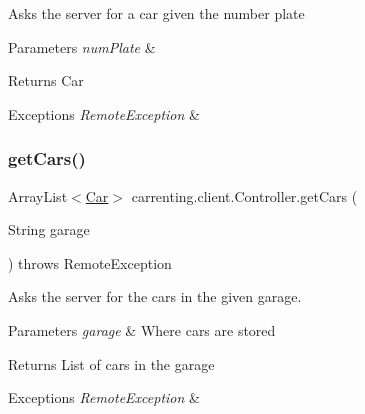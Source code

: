 Asks the server for a car given the number plate


\begin{DoxyParams}{Parameters}
{\em num\+Plate} & \\
\hline
\end{DoxyParams}
\begin{DoxyReturn}{Returns}
Car 
\end{DoxyReturn}

\begin{DoxyExceptions}{Exceptions}
{\em Remote\+Exception} & \\
\hline
\end{DoxyExceptions}
\mbox{\label{classcarrenting_1_1client_1_1_controller_a1e9a90a7164b6a988e23d77ecf39eea9}} 
\subsubsection{\texorpdfstring{getCars()}{getCars()}}
{\footnotesize\ttfamily Array\+List$<$\mbox{\hyperlink{classcarrenting_1_1server_1_1jdo_1_1_car}{Car}}$>$ carrenting.\+client.\+Controller.\+get\+Cars (\begin{DoxyParamCaption}\item[{String}]{garage }\end{DoxyParamCaption}) throws Remote\+Exception}

Asks the server for the cars in the given garage.


\begin{DoxyParams}{Parameters}
{\em garage} & Where cars are stored \\
\hline
\end{DoxyParams}
\begin{DoxyReturn}{Returns}
List of cars in the garage 
\end{DoxyReturn}

\begin{DoxyExceptions}{Exceptions}
{\em Remote\+Exception} & \\
\hline
\end{DoxyExceptions}
\mbox{\label{classcarrenting_1_1client_1_1_controller_a80d021acb8be8a60823c3da433f5495f}} 
